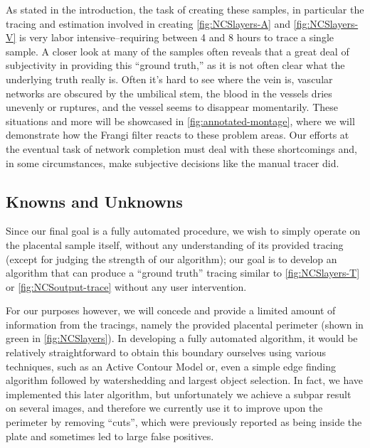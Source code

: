 As stated in the introduction, the task of creating these samples, in particular the tracing and estimation involved in creating \cref{fig:NCSlayers-A} and \cref{fig:NCSlayers-V} is very labor intensive--requiring between 4 and 8 hours to trace a single sample.
A closer look at many of the samples often reveals that a great deal of subjectivity in providing this ``ground truth,'' as it is not often clear what the underlying truth really is. Often it's hard to see where the vein is, vascular networks are obscured by the umbilical stem, the blood in the vessels dries unevenly or ruptures, and the vessel seems to disappear momentarily. These situations and more will be showcased in \cref{fig:annotated-montage}, where we will demonstrate how the Frangi filter reacts to these problem areas. Our efforts at the eventual task of network completion must deal with these shortcomings and, in some circumstances, make subjective decisions like the manual tracer did.


\subsection{Knowns and Unknowns}
Since our final goal is a fully automated procedure, we wish to simply operate on the placental sample itself, without any understanding of its provided tracing (except for judging the strength of our algorithm);
our goal is to develop an algorithm that can produce a ``ground truth'' tracing similar to \cref{fig:NCSlayers-T} or \cref{fig:NCSoutput-trace} without any user intervention.

For our purposes however, we will concede and provide a limited amount of information from the tracings, namely the provided placental perimeter (shown in green in \cref{fig:NCSlayers}). In developing a fully automated algorithm, it would be relatively straightforward to obtain this boundary ourselves using various techniques, such as an Active Contour Model \cite{activecontours} or, even a simple edge finding algorithm followed by watershedding and largest object selection. In fact, we have implemented this later algorithm, but unfortunately we achieve a subpar result on several images, and therefore we currently use it to improve upon the perimeter by removing ``cuts'', which were previously reported as being inside the plate and sometimes led to large false positives. %

